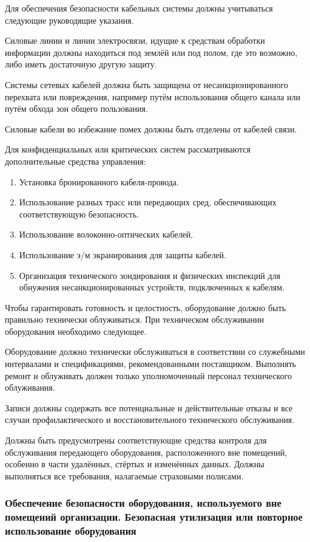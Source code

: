 \documentclass[12pt, russian, oneside, article]{ncc}
\begin{document}
Для обеспечения безопасности кабельных системы должны учитываться следующие руководящие указания.

Силовые линии и линии электросвязи, идущие к средствам обработки информации должны находиться под землёй или под полом, где это возможно, либо иметь достаточную другую защиту.

Системы сетевых кабелей должна быть защищена от несанкционированного перехвата или повреждения, например путём использования общего канала или путём обхода зон общего пользования.

Силовые кабели во избежание помех должны быть отделены от кабелей связи.

Для конфиденциальных или критических систем рассматриваются дополнительные средства управления:
\begin{enumerate}
\item Установка бронированного кабеля-провода.
\item Использование разных трасс или передающих сред, обеспечивающих соответствующую безопасность.
\item Использование волоконно-оптических кабелей.
\item Использование э/м экранирования для защиты кабелей.
\item Организация технического зондирования и физических инспекций для обнужения несанкционированных устройств, подключенных к кабелям.
\end{enumerate}

Чтобы гарантировать готовность и целостность, оборудование должно быть правильно технически облуживаться. При техническом обслуживании оборудования необходимо следующее.

Оборудование должно технически обслуживаться в соответствии со служебными интервалами и спецификациями, рекомендованными поставщиком. Выполнять ремонт и облуживать должен только уполномоченный персонал технического облуживания.

Записи должны содержать все потенциальные и действительные отказы и все случаи профилактического и восстановительного технического обслуживания.

Должны быть предусмотрены соответствующие средства контроля для обслуживания передающего оборудования, расположенного вне помещений, особенно в части удалённых, стёртых и изменённых данных. Должны выполняться все требования, налагаемые страховыми полисами.
\subsubsection{Обеспечение безопасности оборудования, используемого вне помещений организации. Безопасная утилизация или повторное использование оборудования}
\label{sec-5_5_6}
\end{document}
